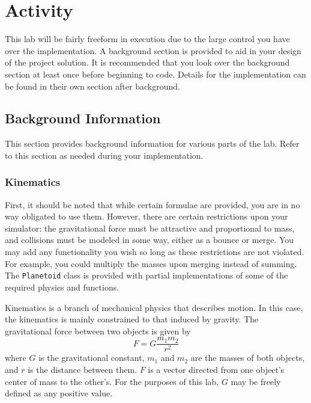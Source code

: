 \section{Activity}
This lab will be fairly freeform in execution due to the large control you have over the implementation.
A background section is provided to aid in your design of the project solution.
It is recommended that you look over the background section at least once before beginning to code.
Details for the implementation can be found in their own section after background.

\subsection{Background Information}
This section provides background information for various parts of the lab.
Refer to this section as needed during your implementation.

\subsubsection{Kinematics}
First, it should be noted that while certain formulae are provided, you are in no way obligated to use them. 
However, there are certain restrictions upon your simulator: the gravitational force must be attractive and proportional to mass, and collisions must be modeled in some way, either as a bounce or merge.
You may add any functionality you wish so long as these restrictions are not violated.
For example, you could multiply the masses upon merging instead of summing.
The \verb=Planetoid= class is provided with partial implementations of some of the required physics and functions.

Kinematics is a branch of mechanical physics that describes motion.
In this case, the kinematics is mainly constrained to that induced by gravity.
The gravitational force between two objects is given by $$F = G{\frac{m_1m_2}{r^2}}$$ where $G$ is the gravitational constant, $m_1$ and $m_2$ are the masses of both objects, and $r$ is the distance between them.
$F$ is a vector directed from one object's center of mass to the other's.
For the purposes of this lab, $G$ may be freely defined as any positive value.

